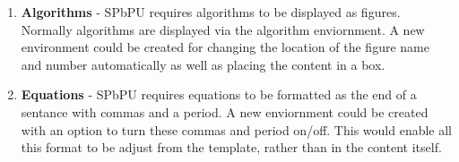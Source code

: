 \label{sec:proposed_extensions}
\begin{enumerate}
    \item \textbf{Algorithms} - SPbPU requires algorithms to be displayed as figures. Normally algorithms are displayed via the algorithm enviornment. A new environment could be created for changing the location of the figure name and number automatically as well as placing the content in a box.
    
    \item \textbf{Equations} - SPbPU requires equations to be formatted as the end of a sentance with commas and a period. A new enviornment could be created with an option to turn these commas and period on/off. This would enable all this format to be adjust from the template, rather than in the content itself.
\end{enumerate}

